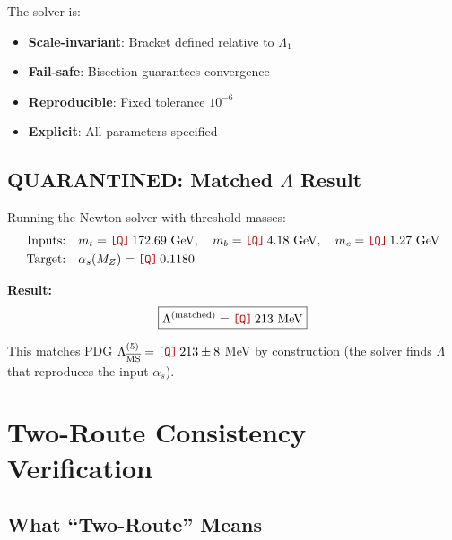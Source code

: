 \documentclass[11pt,a4paper]{article}
\newcommand{\Qnum}[1]{\textcolor{red!70!black}{\texttt{[Q]}}\,#1}
\theoremstyle{definition}
\begin{document}
\begin{solverbox}
The solver is:
\begin{itemize}
  \item \textbf{Scale-invariant}: Bracket defined relative to $\Lambda_1$
  \item \textbf{Fail-safe}: Bisection guarantees convergence
  \item \textbf{Reproducible}: Fixed tolerance $10^{-6}$
  \item \textbf{Explicit}: All parameters specified
\end{itemize}
\end{solverbox}

\subsection{QUARANTINED: Matched $\Lambda$ Result}
\label{subsec:matched-result}

\begin{quarantinebox}
Running the Newton solver with threshold masses:
\begin{align}
\label{eq:matched-input}
\text{Inputs:} \quad &m_t = \Qnum{172.69} \text{ GeV}, \quad
  m_b = \Qnum{4.18} \text{ GeV}, \quad m_c = \Qnum{1.27} \text{ GeV} \\
\label{eq:matched-target}
\text{Target:} \quad &\alpha_s(M_Z) = \Qnum{0.1180}
\end{align}

\textbf{Result:}
\begin{equation}
\label{eq:matched-result}
\boxed{\Lambda^{(\text{matched})} = \Qnum{213} \text{ MeV}}
\end{equation}

This matches PDG $\Lambda_{\overline{\text{MS}}}^{(5)} = \Qnum{213 \pm 8}$ MeV
by construction (the solver finds $\Lambda$ that reproduces the input $\alpha_s$).
\end{quarantinebox}

\section{Two-Route Consistency Verification}
\label{sec:two-route}

\subsection{What ``Two-Route'' Means}
\label{subsec:two-route-meaning}
\end{document}
